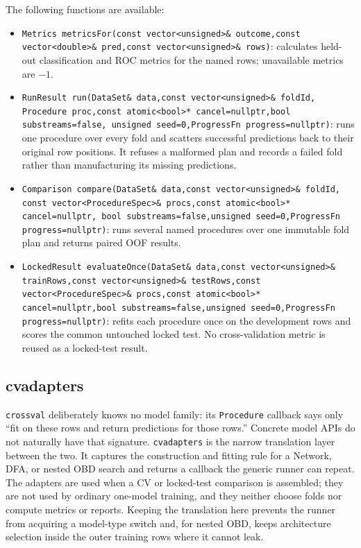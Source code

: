 The following functions are available:

\begin{itemize}
\item \texttt{Metrics metricsFor(const vector<unsigned>\& outcome,const
      vector<double>\& pred,const vector<unsigned>\& rows)}: calculates held-out
      classification and ROC metrics for the named rows; unavailable metrics
      are $-1$.
\item \texttt{RunResult run(DataSet\& data,const vector<unsigned>\& foldId,
      Procedure proc,const atomic<bool>* cancel=nullptr,bool substreams=false,
      unsigned seed=0,ProgressFn progress=nullptr)}: runs one
      procedure over every fold and scatters successful predictions back to
      their original row positions.  It refuses a malformed plan and records a
      failed fold rather than manufacturing its missing predictions.
\item \texttt{Comparison compare(DataSet\& data,const vector<unsigned>\& foldId,
      const vector<ProcedureSpec>\& procs,const atomic<bool>* cancel=nullptr,
      bool substreams=false,unsigned seed=0,ProgressFn progress=nullptr)}: runs several
      named procedures over one immutable fold plan and returns paired OOF
      results.
\item \texttt{LockedResult evaluateOnce(DataSet\& data,const
      vector<unsigned>\& trainRows,const vector<unsigned>\& testRows,const
      vector<ProcedureSpec>\& procs,const atomic<bool>* cancel=nullptr,bool
      substreams=false,unsigned seed=0,ProgressFn progress=nullptr)}: refits each
      procedure once on the development rows and scores the common untouched
      locked test.  No cross-validation metric is reused as a locked-test result.
\end{itemize}

\subsection{cvadapters}
\texttt{crossval} deliberately knows no model family: its \texttt{Procedure}
callback says only ``fit on these rows and return predictions for those rows.''
Concrete model APIs do not naturally have that signature.  \texttt{cvadapters}
is the narrow translation layer between the two.  It captures the construction
and fitting rule for a Network, DFA, or nested OBD search and returns a callback
the generic runner can repeat.  The adapters are used when a CV or locked-test
comparison is assembled; they are not used by ordinary one-model training, and
they neither choose folds nor compute metrics or reports.  Keeping the translation
here prevents the runner from acquiring a model-type switch and, for nested OBD,
keeps architecture selection inside the outer training rows where it cannot leak.

